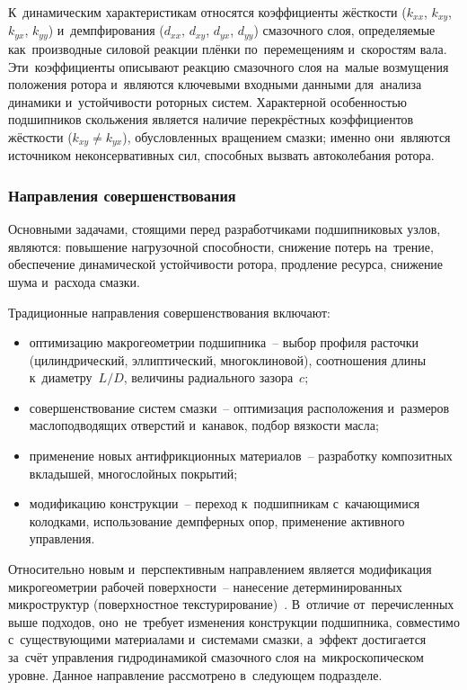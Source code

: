 К~динамическим характеристикам относятся коэффициенты жёсткости ($k_{xx}$, $k_{xy}$, $k_{yx}$, $k_{yy}$) и~демпфирования ($d_{xx}$, $d_{xy}$, $d_{yx}$, $d_{yy}$) смазочного слоя, определяемые как~производные силовой реакции плёнки по~перемещениям и~скоростям вала. Эти~коэффициенты описывают реакцию смазочного слоя на~малые возмущения положения ротора и~являются ключевыми входными данными для~анализа динамики и~устойчивости роторных систем. Характерной особенностью подшипников скольжения является наличие перекрёстных коэффициентов жёсткости ($k_{xy} \neq k_{yx}$), обусловленных вращением смазки; именно они~являются источником неконсервативных сил, способных вызвать автоколебания ротора.

\subsubsection{Направления совершенствования}

Основными задачами, стоящими перед разработчиками подшипниковых узлов, являются: повышение нагрузочной способности, снижение потерь на~трение, обеспечение динамической устойчивости ротора, продление ресурса, снижение шума и~расхода смазки.

Традиционные направления совершенствования включают:
\begin{itemize}
\item оптимизацию макрогеометрии подшипника~-- выбор профиля расточки (цилиндрический, эллиптический, многоклиновой), соотношения длины к~диаметру~$L/D$, величины радиального зазора~$c$;
\item совершенствование систем смазки~-- оптимизация расположения и~размеров маслоподводящих отверстий и~канавок, подбор вязкости масла;
\item применение новых антифрикционных материалов~-- разработку композитных вкладышей, многослойных покрытий;
\item модификацию конструкции~-- переход к~подшипникам с~качающимися колодками, использование демпферных опор, применение активного управления.
\end{itemize}

Относительно новым и~перспективным направлением является модификация микрогеометрии рабочей поверхности~-- нанесение детерминированных микроструктур (поверхностное текстурирование)~\cite{senatore2018,bashmur2024b}. В~отличие от~перечисленных выше подходов, оно~не~требует изменения конструкции подшипника, совместимо с~существующими материалами и~системами смазки, а~эффект достигается за~счёт управления гидродинамикой смазочного слоя на~микроскопическом уровне. Данное направление рассмотрено в~следующем подразделе.


